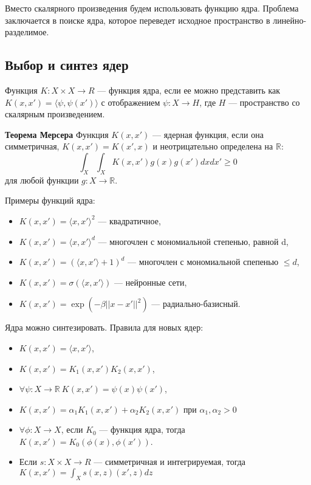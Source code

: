 Вместо скалярного произведения будем использовать функцию ядра. Проблема
заключается в поиске ядра, которое переведет исходное пространство в
линейно-разделимое.

\subsection{Выбор и синтез ядер}

Функция $K : X \times X \to R$ --- функция ядра, если ее можно представить как
$K(x, x') = \langle \psi, \psi(x') \rangle$ с отображением $\psi: X \to H$, где
$H$ --- пространство со скалярным произведением.

\textbf{Теорема Мерсера} Функция $K(x, x')$ --- ядерная функция, если она
симметричная, $K(x, x') = K(x', x)$ и неотрицательно определена на
$\mathbb{R}$:
\[
    \int_X \int_X K(x, x') g(x) g(x') dx dx' \geq 0
\]
для любой функции $g: X \to \mathbb{R}$.

Примеры функций ядра:
\begin{itemize}
    \item $K(x, x') = \langle x, x' \rangle^2$ --- квадратичное,
    \item $K(x, x') = \langle x, x' \rangle^d$ --- многочлен с мономиальной
        степенью, равной d,
    \item $K(x, x') = (\langle x, x' \rangle + 1)^d$ --- многочлен с
        мономиальной спепенью $\leq d$,
    \item $K(x, x') = \sigma(\langle x, x' \rangle)$ --- нейронные сети,
    \item $K(x, x') = \exp(-\beta ||x - x'||^2)$ --- радиально-базисный.
\end{itemize}

Ядра можно синтезировать. Правила для новых ядер:
\begin{itemize}
    \item $K(x, x') = \langle x, x' \rangle$,

    \item $K(x, x') = K_1(x, x') K_2(x, x')$,

    \item $\forall \psi : X \to \mathbb{R}\ K(x, x') = \psi(x) \psi(x')$,

    \item $K(x, x') = \alpha_1 K_1 (x, x') + \alpha_2 K_2 (x, x')$ при
        $\alpha_1, \alpha_2 > 0$

    \item $\forall \phi : X \to X$, если $K_0$ --- функция ядра, тогда $K(x,
        x') = K_0(\phi(x), \phi(x'))$.

    \item Если $s : X \times X \to R$ --- симметричная и интегрируемая, тогда
        $K(x, x') = \int_X s(x, z)(x', z)dz$
\end{itemize}

